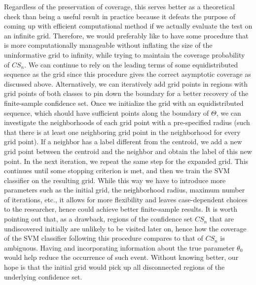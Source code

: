 \documentclass[12pt]{article}
\theoremstyle{definition}
\begin{document}
Regardless of the preservation of coverage, this serves better as a theoretical check than being a useful result in practice because it defeats the purpose of coming up with efficient computational method if we actually evaluate the test on an infinite grid. Therefore, we would preferably like to have some procedure that is more computationally manageable without inflating the size of the uninformative grid to infinity, while trying to maintain the coverage probability of $CS_n$. We can continue to rely on the leading terms of some equidistributed sequence as the grid since this procedure gives the correct asymptotic coverage as discussed above. Alternatively, we can iteratively add grid points in regions with grid points of both classes to pin down the boundary for a better recovery of the finite-sample confidence set. Once we initialize the grid with an equidistributed sequence, which should have sufficient points along the boundary of $\Theta$, we can investigate the neighborhoods of each grid point with a pre-specified radius (such that there is at least one neighboring grid point in the neighborhood for every grid point). If a neighbor has a label different from the centroid, we add a new grid point between the centroid and the neighbor and obtain the label of this new point. In the next iteration, we repeat the same step for the expanded grid. This continues until some stopping criterion is met, and then we train the SVM classifier on the resulting grid. While this way we have to introduce more parameters such as the initial grid, the neighborhood radius, maximum number of iterations, etc., it allows for more flexibility and leaves case-dependent choices to the researcher, hence could achieve better finite-sample results. It is worth pointing out that, as a drawback, regions of the confidence set $CS_n$ that are undiscovered initially are unlikely to be visited later on, hence how the coverage of the SVM classifier following this procedure compares to that of $CS_n$ is ambiguous. Having and incorporating information about the true parameter $\theta_0$ would help reduce the occurrence of such event. Without knowing better, our hope is that the initial grid would pick up all disconnected regions of the underlying confidence set.
\end{document}
